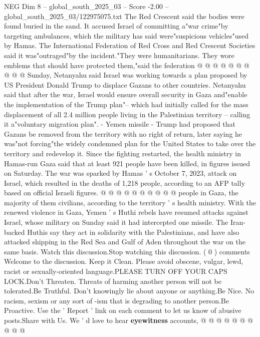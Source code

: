 \begin{textsample}{NEG Dim 8 – global\_south\_2025\_03 – Score -2.00 – global\_south\_2025\_03/122975075.txt}
The Red Crescent said the bodies were found buried in the sand.
It accused Israel of committing a"war crime"by targeting ambulances, which the military has said were"suspicious vehicles"used by Hamas.
The International Federation of Red Cross and Red Crescent Societies said it was"outraged"by the incident."They were humanitarians.
They wore emblems that should have protected them,"said the federation @ @ @ @ @ @ @ @ @ @ Sunday, Netanyahu said Israel was working towards a plan proposed by US President Donald Trump to displace Gazans to other countries.
Netanyahu said that after the war, Israel would ensure overall security in Gaza and"enable the implementation of the Trump plan"-- which had initially called for the mass displacement of all 2.4 million people living in the Palestinian territory -- calling it a"voluntary migration plan". - Yemen missile - Trump had proposed that Gazans be removed from the territory with no right of return, later saying he was"not forcing"the widely condemned plan for the United States to take over the territory and redevelop it.
Since the fighting restarted, the health ministry in Hamas-run Gaza said that at least 921 people have been killed, in figures issued on Saturday.
The war was sparked by Hamas ' s October 7, 2023, attack on Israel, which resulted in the deaths of 1,218 people, according to an AFP tally based on official Israeli figures. @ @ @ @ @ @ @ @ @ @ people in Gaza, the majority of them civilians, according to the territory ' s health ministry.
With the renewed violence in Gaza, Yemen ' s Huthi rebels have resumed attacks against Israel, whose military on Sunday said it had intercepted one missile.
The Iran-backed Huthis say they act in solidarity with the Palestinians, and have also attacked shipping in the Red Sea and Gulf of Aden throughout the war on the same basis.
Watch this discussion.Stop watching this discussion. ( 0 ) comments Welcome to the discussion.
Keep it Clean.
Please avoid obscene, vulgar, lewd, racist or sexually-oriented language.PLEASE TURN OFF YOUR CAPS LOCK.Don't Threaten.
Threats of harming another person will not be tolerated.Be Truthful.
Don't knowingly lie about anyone or anything.Be Nice.
No racism, sexism or any sort of -ism that is degrading to another person.Be Proactive.
Use the ' Report ' link on each comment to let us know of abusive posts.Share with Us.
We ' d love to hear \textbf{eyewitness} accounts, @ @ @ @ @ @ @ @ @ @

\end{textsample}
